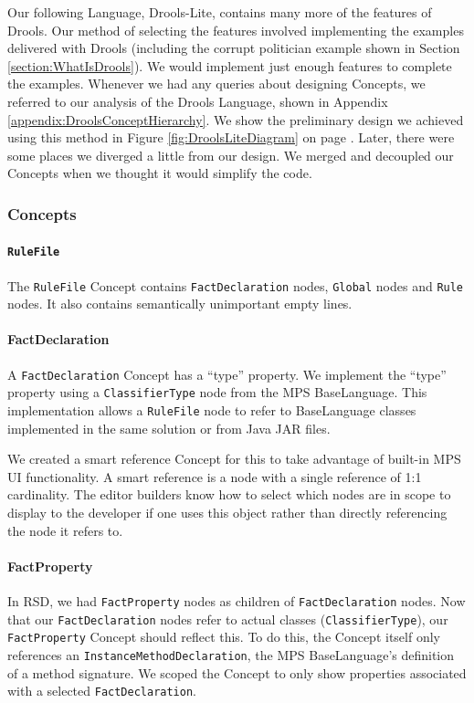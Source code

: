 Our following Language, Drools-Lite, contains many more of the features of Drools.
Our method of selecting the features involved implementing the examples delivered with Drools (including the corrupt politician example shown in Section \ref{section:WhatIsDrools}).
We would implement just enough features to complete the examples.
Whenever we had any queries about designing Concepts, we referred to our analysis of the Drools Language, shown in Appendix \ref{appendix:DroolsConceptHierarchy}.
We show the preliminary design we achieved using this method in Figure \ref{fig:DroolsLiteDiagram} on page \pageref{fig:DroolsLiteDiagram}.
Later, there were some places we diverged a little from our design.
We merged and decoupled our Concepts when we thought it would simplify the code.

\subsubsection{Concepts}

\paragraph{\texttt{RuleFile}} The \texttt{RuleFile} Concept contains \texttt{FactDeclaration} nodes, \texttt{Global} nodes and \texttt{Rule} nodes.
It also contains semantically unimportant empty lines.

\paragraph{FactDeclaration} A \texttt{FactDeclaration} Concept has a ``type'' property.
We implement the ``type'' property using a \texttt{ClassifierType} node from the MPS BaseLanguage.
This implementation allows a \texttt{RuleFile} node to refer to BaseLanguage classes implemented in the same solution or from Java JAR files.

We created a smart reference Concept for this to take advantage of built-in MPS UI functionality.
A smart reference is a node with a single reference of 1:1 cardinality.
The editor builders know how to select which nodes are in scope to display to the developer if one uses this object rather than directly referencing the node it refers to.

\paragraph{FactProperty} In RSD, we had \texttt{FactProperty} nodes as children of \texttt{FactDeclaration} nodes.
Now that our \texttt{FactDeclaration} nodes refer to actual classes (\texttt{ClassifierType}), our \texttt{FactProperty} Concept should reflect this.
To do this, the Concept itself only references an \texttt{InstanceMethodDeclaration}, the MPS BaseLanguage's definition of a method signature.
We scoped the Concept to only show properties associated with a selected \texttt{FactDeclaration}.

